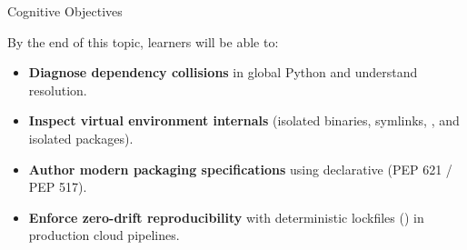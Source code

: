 \documentclass[../m00-session-04.tex]{subfiles}
\begin{document}

\begin{frame}{Cognitive Objectives}
  \begin{LearningObjectives}{By the end of this topic, learners will be able to:}
    \begin{itemize}\setlength{\itemsep}{0.28em}
      \item \textbf{Diagnose dependency collisions} in global Python  and understand  resolution.
      \item \textbf{Inspect virtual environment internals} (isolated binaries, symlinks, , and isolated packages).
      \item \textbf{Author modern packaging specifications} using declarative  (PEP 621 / PEP 517).
      \item \textbf{Enforce zero-drift reproducibility} with deterministic lockfiles () in production cloud pipelines.
    \end{itemize}
  \end{LearningObjectives}
\end{frame}
\end{document}
